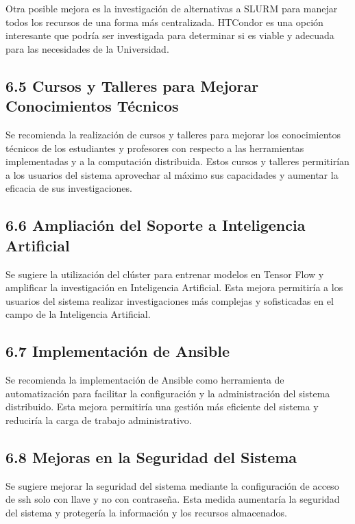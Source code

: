 \begin{spacing}{1.5}
Otra posible mejora es la investigación de alternativas a SLURM para manejar todos los recursos de una forma más centralizada. HTCondor es una opción interesante que podría ser investigada para determinar si es viable y adecuada para las necesidades de la Universidad.

\subsection{6.5 Cursos y Talleres para Mejorar Conocimientos Técnicos}

Se recomienda la realización de cursos y talleres para mejorar los conocimientos técnicos de los estudiantes y profesores con respecto a las herramientas implementadas y a la computación distribuida. Estos cursos y talleres permitirían a los usuarios del sistema aprovechar al máximo sus capacidades y aumentar la eficacia de sus investigaciones.

\subsection{6.6 Ampliación del Soporte a Inteligencia Artificial}

Se sugiere la utilización del clúster para entrenar modelos en Tensor Flow y amplificar la investigación en Inteligencia Artificial. Esta mejora permitiría a los usuarios del sistema realizar investigaciones más complejas y sofisticadas en el campo de la Inteligencia Artificial.

\subsection{6.7 Implementación de Ansible}

Se recomienda la implementación de Ansible como herramienta de automatización para facilitar la configuración y la administración del sistema distribuido. Esta mejora permitiría una gestión más eficiente del sistema y reduciría la carga de trabajo administrativo.

\subsection{6.8 Mejoras en la Seguridad del Sistema}

Se sugiere mejorar la seguridad del sistema mediante la configuración de acceso de ssh solo con llave y no con contraseña. Esta medida aumentaría la seguridad del sistema y protegería la información y los recursos almacenados.


\end{spacing}
